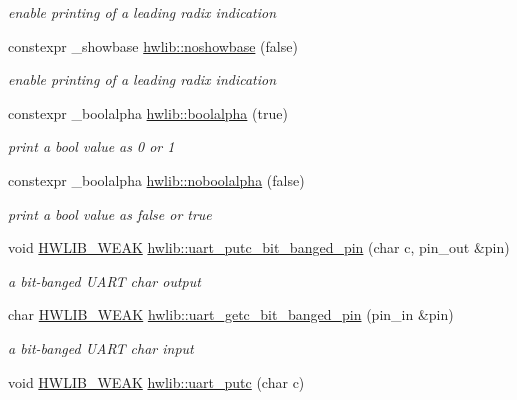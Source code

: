 \begin{DoxyCompactItemize}
\begin{DoxyCompactList}\small\item\em enable printing of a leading radix indication \end{DoxyCompactList}\item 
constexpr \+\_\+showbase \hyperlink{namespacehwlib_af813ae25dc70ae85e2f06dcf81f8963b}{hwlib\+::noshowbase} (false)
\begin{DoxyCompactList}\small\item\em enable printing of a leading radix indication \end{DoxyCompactList}\item 
constexpr \+\_\+boolalpha \hyperlink{namespacehwlib_a499e8cd6806e66c4c425b64c9512a21c}{hwlib\+::boolalpha} (true)
\begin{DoxyCompactList}\small\item\em print a bool value as \textquotesingle{}0\textquotesingle{} or \textquotesingle{}1\textquotesingle{} \end{DoxyCompactList}\item 
constexpr \+\_\+boolalpha \hyperlink{namespacehwlib_a6fe77cc67d9850cb262eb6e15e37724d}{hwlib\+::noboolalpha} (false)
\begin{DoxyCompactList}\small\item\em print a bool value as \textquotesingle{}false\textquotesingle{} or \textquotesingle{}true\textquotesingle{} \end{DoxyCompactList}\item 
void \hyperlink{hwlib-defines_8hpp_a04be4340016df60d6636c1d1c6d94fc9}{H\+W\+L\+I\+B\+\_\+\+W\+E\+AK} \hyperlink{namespacehwlib_a10ed5b50cabfea49044e22331ac6f284}{hwlib\+::uart\+\_\+putc\+\_\+bit\+\_\+banged\+\_\+pin} (char c, pin\+\_\+out \&pin)
\begin{DoxyCompactList}\small\item\em a bit-\/banged U\+A\+RT char output \end{DoxyCompactList}\item 
char \hyperlink{hwlib-defines_8hpp_a04be4340016df60d6636c1d1c6d94fc9}{H\+W\+L\+I\+B\+\_\+\+W\+E\+AK} \hyperlink{namespacehwlib_a7dcb57f59ee55d80c76b7b7c09044a2f}{hwlib\+::uart\+\_\+getc\+\_\+bit\+\_\+banged\+\_\+pin} (pin\+\_\+in \&pin)
\begin{DoxyCompactList}\small\item\em a bit-\/banged U\+A\+RT char input \end{DoxyCompactList}\item 
void \hyperlink{hwlib-defines_8hpp_a04be4340016df60d6636c1d1c6d94fc9}{H\+W\+L\+I\+B\+\_\+\+W\+E\+AK} \hyperlink{namespacehwlib_ae568ebef4b8d8a77cecae8cea595896f}{hwlib\+::uart\+\_\+putc} (char c)

\end{DoxyCompactItemize}

